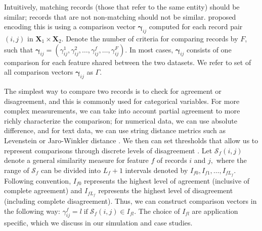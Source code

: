 \documentclass[ba]{imsart}
\begin{document}
Intuitively, matching records (those that refer to the same entity) should be similar; records that are not non-matching should not be similar. \cite{fellegi_theory_1969} proposed encoding this is using a comparison vector $\bm{\gamma}_{ij}$ computed for each record pair $(i,j)$ in $\bm{X}_1 \times \bm{X}_2.$ Denote the number of criteria for comparing records by $F$, such that $\bm{\gamma}_{ij} = (\gamma_{ij}^1, \gamma_{ij}^2, \ldots, \gamma_{ij}^f, \ldots, \gamma_{ij}^F).$ In most cases, $\bm{\gamma}_{ij}$ consists of one comparison for each feature shared between the two datasets. We refer to set of all comparison vectors $\bm{\gamma}_{ij}$ as $\Gamma$.

The simplest way to compare two records is to check for agreement or disagreement, and this is commonly used for categorical variables. For more complex measurements, we can take into account partial agreement to more richly characterize the comparison; for numerical data, we can use absolute difference, and for text data, we can use string distance metrics such as Levenstein or Jaro-Winkler distance \citep{cohen2003comparison}. We then can set thresholds that allow us to represent comparisons through discrete levels of disagreement \citep{bilenko2006riddle, elmagarmid_duplicate_2007}. Let $\mathcal{S}_f(i,j)$ denote a general similarity measure for feature $f$ of records $i$ and $j,$ where the range of $\mathcal{S}_f$ can be divided into $L_f +1$ intervals denoted by $I_{f0}, I_{f1}, \ldots, I_{fL_f}$. Following convention, $I_{f0}$ represents the highest level of agreement (inclusive of complete agreement) and $I_{fL_f}$ represents the highest level of disagreement (including complete disagreement). Thus, we can construct comparison vectors in the following way: $\gamma_{ij}^f = l \; \text{if} \; \mathcal{S}_f(i,j) \in I_{fl}.$ The choice of $I_{fl}$ are application specific, which we discuss in our simulation and case studies. 

\end{document}
